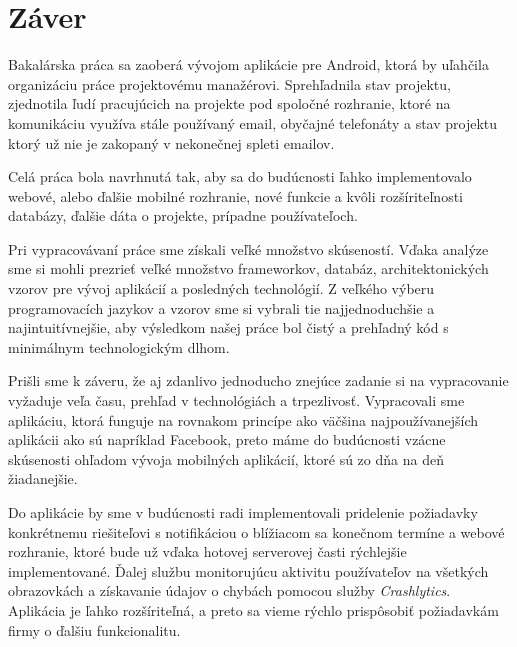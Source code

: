 \chapter*{Záver}

Bakalárska práca sa zaoberá vývojom aplikácie pre Android, ktorá by uľahčila organizáciu práce projektovému manažérovi. Sprehľadnila stav projektu, zjednotila ľudí pracujúcich na projekte pod spoločné rozhranie, ktoré na komunikáciu využíva stále používaný email, obyčajné telefonáty a stav projektu ktorý už nie je zakopaný v nekonečnej spleti emailov.

Celá práca bola navrhnutá tak, aby sa do budúcnosti ľahko implementovalo webové, alebo ďalšie mobilné rozhranie, nové funkcie a kvôli rozšíriteľnosti databázy, ďalšie dáta o projekte, prípadne používateľoch. 

Pri vypracovávaní práce sme získali veľké množstvo skúseností. Vďaka analýze sme si mohli prezrieť veľké množstvo frameworkov, databáz, architektonických vzorov pre vývoj aplikácií a posledných     technológií. Z veľkého výberu programovacích jazykov a vzorov sme si vybrali tie najjednoduchšie a najintuitívnejšie, aby  výsledkom našej práce bol čistý a  prehľadný kód s minimálnym technologickým dlhom.

Prišli sme k záveru, že aj zdanlivo jednoducho znejúce zadanie si na vypracovanie vyžaduje veľa času, prehľad v technológiách a trpezlivosť. Vypracovali sme aplikáciu, ktorá funguje na rovnakom princípe ako väčšina najpoužívanejších aplikácii ako sú napríklad Facebook, preto máme do budúcnosti vzácne skúsenosti ohľadom vývoja mobilných aplikácií, ktoré sú zo dňa na deň žiadanejšie. 

Do aplikácie by sme v budúcnosti radi implementovali pridelenie požiadavky konkrétnemu riešiteľovi s notifikáciou o blížiacom sa konečnom termíne a webové rozhranie, ktoré bude už vďaka hotovej serverovej časti rýchlejšie implementované. Ďalej službu monitorujúcu aktivitu používateľov na všetkých obrazovkách a získavanie údajov o chybách pomocou služby \textit{Crashlytics}. Aplikácia je ľahko rozšíriteľná, a preto sa vieme rýchlo prispôsobiť požiadavkám firmy o ďalšiu funkcionalitu.